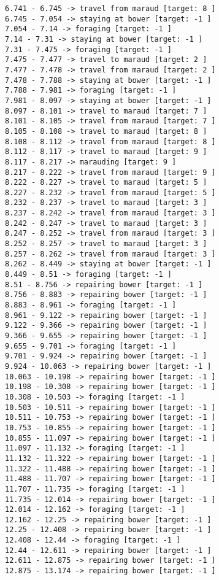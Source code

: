 \documentclass[11pt]{article}
\begin{document}
\begin{Verbatim}[commandchars=\\\{\}]
6.741 - 6.745 -> travel from maraud [target: 8 ]
6.745 - 7.054 -> staying at bower [target: -1 ]
7.054 - 7.14 -> foraging [target: -1 ]
7.14 - 7.31 -> staying at bower [target: -1 ]
7.31 - 7.475 -> foraging [target: -1 ]
7.475 - 7.477 -> travel to maraud [target: 2 ]
7.477 - 7.478 -> travel from maraud [target: 2 ]
7.478 - 7.788 -> staying at bower [target: -1 ]
7.788 - 7.981 -> foraging [target: -1 ]
7.981 - 8.097 -> staying at bower [target: -1 ]
8.097 - 8.101 -> travel to maraud [target: 7 ]
8.101 - 8.105 -> travel from maraud [target: 7 ]
8.105 - 8.108 -> travel to maraud [target: 8 ]
8.108 - 8.112 -> travel from maraud [target: 8 ]
8.112 - 8.117 -> travel to maraud [target: 9 ]
8.117 - 8.217 -> marauding [target: 9 ]
8.217 - 8.222 -> travel from maraud [target: 9 ]
8.222 - 8.227 -> travel to maraud [target: 5 ]
8.227 - 8.232 -> travel from maraud [target: 5 ]
8.232 - 8.237 -> travel to maraud [target: 3 ]
8.237 - 8.242 -> travel from maraud [target: 3 ]
8.242 - 8.247 -> travel to maraud [target: 3 ]
8.247 - 8.252 -> travel from maraud [target: 3 ]
8.252 - 8.257 -> travel to maraud [target: 3 ]
8.257 - 8.262 -> travel from maraud [target: 3 ]
8.262 - 8.449 -> staying at bower [target: -1 ]
8.449 - 8.51 -> foraging [target: -1 ]
8.51 - 8.756 -> repairing bower [target: -1 ]
8.756 - 8.883 -> repairing bower [target: -1 ]
8.883 - 8.961 -> foraging [target: -1 ]
8.961 - 9.122 -> repairing bower [target: -1 ]
9.122 - 9.366 -> repairing bower [target: -1 ]
9.366 - 9.655 -> repairing bower [target: -1 ]
9.655 - 9.701 -> foraging [target: -1 ]
9.701 - 9.924 -> repairing bower [target: -1 ]
9.924 - 10.063 -> repairing bower [target: -1 ]
10.063 - 10.198 -> repairing bower [target: -1 ]
10.198 - 10.308 -> repairing bower [target: -1 ]
10.308 - 10.503 -> foraging [target: -1 ]
10.503 - 10.511 -> repairing bower [target: -1 ]
10.511 - 10.753 -> repairing bower [target: -1 ]
10.753 - 10.855 -> repairing bower [target: -1 ]
10.855 - 11.097 -> repairing bower [target: -1 ]
11.097 - 11.132 -> foraging [target: -1 ]
11.132 - 11.322 -> repairing bower [target: -1 ]
11.322 - 11.488 -> repairing bower [target: -1 ]
11.488 - 11.707 -> repairing bower [target: -1 ]
11.707 - 11.735 -> foraging [target: -1 ]
11.735 - 12.014 -> repairing bower [target: -1 ]
12.014 - 12.162 -> foraging [target: -1 ]
12.162 - 12.25 -> repairing bower [target: -1 ]
12.25 - 12.408 -> repairing bower [target: -1 ]
12.408 - 12.44 -> foraging [target: -1 ]
12.44 - 12.611 -> repairing bower [target: -1 ]
12.611 - 12.875 -> repairing bower [target: -1 ]
12.875 - 13.174 -> repairing bower [target: -1 ]

\end{Verbatim}
\end{document}
